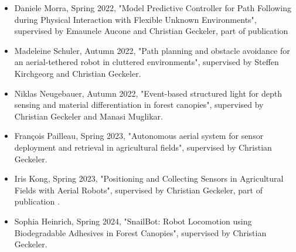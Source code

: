 \begin{itemize}
    \item Daniele Morra, Spring 2022, "Model Predictive Controller for Path Following during Physical Interaction with Flexible Unknown Environments", supervised by Emaunele Aucone and Christian Geckeler, part of publication \cite{Aucone2024}

    \item  Madeleine Schuler, Autumn 2022, "Path planning and obstacle avoidance for an aerial-tethered robot in cluttered environments", supervised by Steffen Kirchgeorg and Christian Geckeler.

    \item Niklas Neugebauer, Autumn 2022, "Event-based structured light for depth sensing and material differentiation in forest canopies", supervised by Christian Geckeler and Manasi Muglikar.

    \item François Pailleau, Spring 2023, "Autonomous aerial system for sensor deployment and retrieval in agricultural fields", supervised by Christian Geckeler.

    \item Iris Kong, Spring 2023, "Positioning and Collecting Sensors in Agricultural Fields with Aerial Robots", supervised by Christian Geckeler, part of publication \cite{Geckeler2024a}.

    \item Sophia Heinrich, Spring 2024, "SnailBot: Robot Locomotion using Biodegradable Adhesives in Forest Canopies", supervised by Christian Geckeler. 
\end{itemize}


